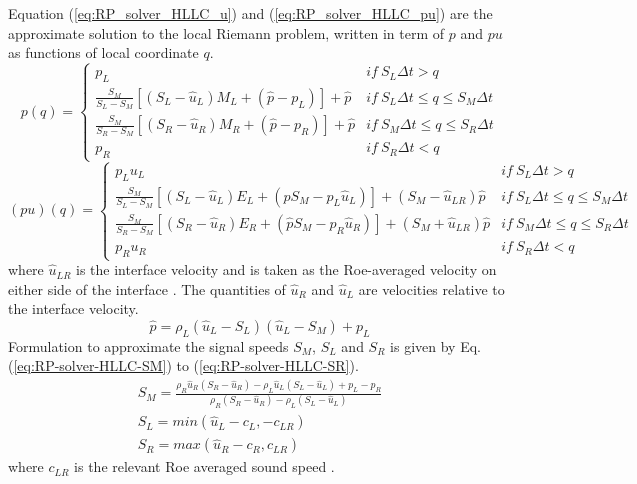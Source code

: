 Equation (\ref{eq:RP_solver_HLLC_u}) and (\ref{eq:RP_solver_HLLC_pu}) are the approximate solution to the local Riemann problem, written in term of $p$ and $pu$ as functions of local coordinate $q$.
\begin{equation}
p \left( q \right) =  \begin{cases} 
      p_L & if \  S_L \Delta t> q \\
      \frac{S_M}{S_L - S_M}\left [ (S_L - \hat{u}_L) M_L + (\hat{p}- p_L) \right] + \hat{p} & if \  S_L \Delta t \leq q \leq S_M \Delta t \\
      \frac{S_M}{S_R - S_M}\left [ (S_R - \hat{u}_R) M_R + (\hat{p}- p_R) \right] + \hat{p} & if \  S_M \Delta t \leq q \leq S_R \Delta t \\
      p_R & if \  S_R \Delta t < q
\end{cases}
\label{eq:RP_solver_HLLC_u}
\end{equation}
\begin{equation}
(pu) \left( q \right)  =  \begin{cases} 
      p_L u_L& if \  S_L \Delta t > q \\
      \frac{S_M}{S_L - S_M}\left [ (S_L - \hat{u}_L) E_L + (\hat{p} S_M - p_L \hat{u}_L) \right] + (S_M - \hat{u}_{LR}) \hat{p} & if \  S_L \Delta t \leq q \leq S_M \Delta t \\
      \frac{S_M}{S_R - S_M}\left [ (S_R - \hat{u}_R) E_R + (\hat{p} S_M- p_R \hat{u}_R) \right] + (S_M + \hat{u}_{LR}) \hat{p} & if \ S_M \Delta t \leq q \leq S_R \Delta t\\
      p_R u_R & if \  S_R \Delta t < q
\end{cases}
\label{eq:RP_solver_HLLC_pu}
\end{equation}
where $\hat{u}_{LR}$ is the interface velocity and is taken as the Roe-averaged velocity on either side of the interface \citep{cheng2007high}. The quantities of $\hat{u}_R$ and $\hat{u}_L$ are velocities relative to the interface velocity.
\begin{equation}
\hat{p}= \rho_L (\hat{u}_L - S_L) (\hat{u}_L - S_M) + p_L
\end{equation}
Formulation to approximate the signal speeds $S_M$, $S_L$ and $S_R$ is given by Eq. (\ref{eq:RP-solver-HLLC-SM}) to (\ref{eq:RP-solver-HLLC-SR}).
\begin{eqnarray}
S_M= \frac{\rho_R \hat{u}_R (S_R - \hat{u}_R) - \rho_L \hat{u}_L (S_L - \hat{u}_L) + p_L - p_R}{\rho_R (S_R - \hat{u}_R) - \rho_L (S_L - \hat{u}_L)} \label{eq:RP-solver-HLLC-SM} \\
S_L = min (\hat{u}_L - c_L, -c_{LR}) \label{eq:RP-solver-HLLC-SL} \\
S_R = max (\hat{u}_R - c_R, c_{LR}) \label{eq:RP-solver-HLLC-SR}
\end{eqnarray}
where $c_{LR}$ is the relevant Roe averaged sound speed \citep{cheng2007high}. 

